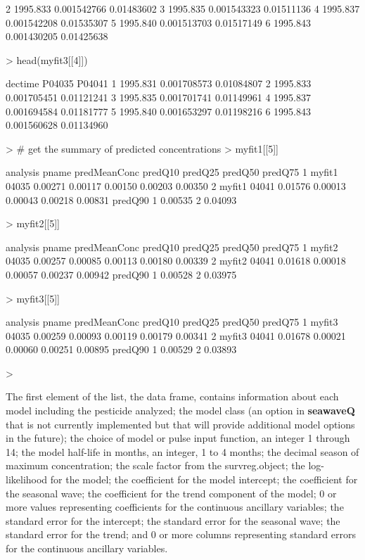 \documentclass[11pt]{article}
\begin{document}
\begin{Schunk}
\begin{Soutput}
2 1995.833 0.001542766 0.01483602
3 1995.835 0.001543323 0.01511136
4 1995.837 0.001542208 0.01535307
5 1995.840 0.001513703 0.01517149
6 1995.843 0.001430205 0.01425638
\end{Soutput}
\begin{Sinput}
> head(myfit3[[4]])
\end{Sinput}
\begin{Soutput}
   dectime      P04035     P04041
1 1995.831 0.001708573 0.01084807
2 1995.833 0.001705451 0.01121241
3 1995.835 0.001701741 0.01149961
4 1995.837 0.001694584 0.01181777
5 1995.840 0.001653297 0.01198216
6 1995.843 0.001560628 0.01134960
\end{Soutput}
\begin{Sinput}
> # get the summary of predicted concentrations
> myfit1[[5]]
\end{Sinput}
\begin{Soutput}
  analysis pname predMeanConc predQ10 predQ25 predQ50 predQ75
1   myfit1 04035      0.00271 0.00117 0.00150 0.00203 0.00350
2   myfit1 04041      0.01576 0.00013 0.00043 0.00218 0.00831
  predQ90
1 0.00535
2 0.04093
\end{Soutput}
\begin{Sinput}
> myfit2[[5]]
\end{Sinput}
\begin{Soutput}
  analysis pname predMeanConc predQ10 predQ25 predQ50 predQ75
1   myfit2 04035      0.00257 0.00085 0.00113 0.00180 0.00339
2   myfit2 04041      0.01618 0.00018 0.00057 0.00237 0.00942
  predQ90
1 0.00528
2 0.03975
\end{Soutput}
\begin{Sinput}
> myfit3[[5]]
\end{Sinput}
\begin{Soutput}
  analysis pname predMeanConc predQ10 predQ25 predQ50 predQ75
1   myfit3 04035      0.00259 0.00093 0.00119 0.00179 0.00341
2   myfit3 04041      0.01678 0.00021 0.00060 0.00251 0.00895
  predQ90
1 0.00529
2 0.03893
\end{Soutput}
\begin{Sinput}
> 
\end{Sinput}
\end{Schunk}
\vspace{5 mm}
The first element of the list, the data frame, contains information about each model including the pesticide analyzed; the model class (an option in \textbf{seawaveQ} that is not currently implemented but that will provide additional model options in the future); the choice of model or pulse input function, an integer 1 through 14; the model half-life in months, an integer, 1 to 4 months; the decimal season of maximum concentration; the scale factor from the survreg.object; the log-likelihood for the model; the coefficient for the model intercept; the coefficient for the seasonal wave; the coefficient for the trend component of the model; 0 or more values representing coefficients for the continuous ancillary variables; the standard error for the intercept; the standard error for the seasonal wave; the standard error for the trend; and 0 or more columns representing standard errors for the continuous ancillary variables.
\end{document}
